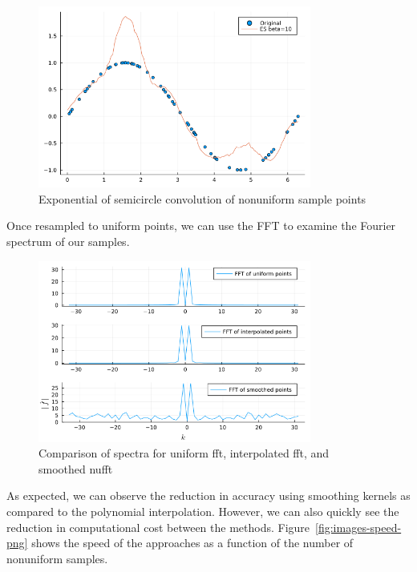 \begin{figure}[htpb!]
    \centering
    \includegraphics[width=0.8\textwidth]{images/es.png}
    \caption{Exponential of semicircle convolution of nonuniform sample points}
    \label{fig:images-es-png}
\end{figure}

Once resampled to uniform points, we can use the FFT to examine the Fourier spectrum of our samples.

\begin{figure}[htpb!]
    \centering
    \includegraphics[width=0.8\textwidth]{images/fft_comparison.png}
    \caption{Comparison of spectra for uniform fft, interpolated fft, and smoothed nufft}
    \label{fig:images-fft-png}
\end{figure}

As expected, we can observe the reduction in accuracy using smoothing kernels as compared to the polynomial interpolation.
However, we can also quickly see the reduction in computational cost between the methods.
Figure~\ref{fig:images-speed-png} shows the speed of the approaches as a function of the number of nonuniform samples.

